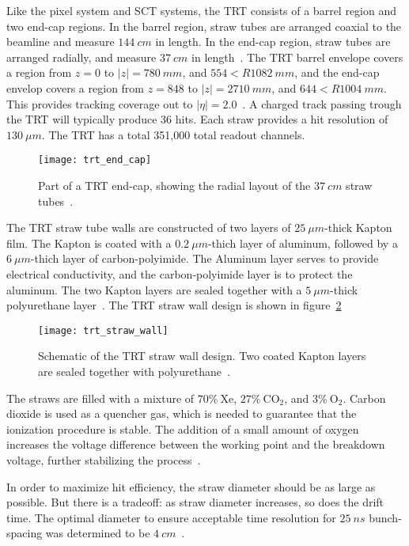 Like the pixel system and SCT systems, the TRT consists of a barrel region and two end-cap regions.
In the barrel region, straw tubes are arranged coaxial to the beamline and measure $144~cm$ in length.
In the end-cap region, straw tubes are arranged radially, and measure $37~cm$ in length~\cite{atlas-detector-2008}.
The TRT barrel envelope covers a region from $z = 0$ to $|z|  = 780~mm$, and $554 < R 1082~mm$, and the end-cap envelop covers a region from $z = 848$ to $|z|  = 2710~mm$, and $644 < R 1004~mm$.
This provides tracking coverage out to $|\eta| = 2.0$~\cite{atlas-detector-2008}.
A charged track passing trough the TRT will typically produce 36 hits.
Each straw provides a hit resolution of $130~\mu m$.
The TRT has a total 351,000 total readout channels.

\begin{figure}[!ht]\centering
\texttt{[image: trt\_end\_cap]}
\caption{Part of a TRT end-cap, showing the radial layout of the $37~cm$ straw tubes~\cite{trt-2013}.}
\label{fig:trt_end_cap}
\end{figure}

The TRT straw tube walls are constructed of two layers of $25~\mu m$-thick Kapton film.
The Kapton is coated with a $0.2~\mu m$-thich layer of aluminum, followed by a $6~\mu m$-thich layer of carbon-polyimide.
The Aluminum layer serves to provide electrical conductivity, and the carbon-polyimide layer is to protect the aluminum.
The two Kapton layers are sealed together with a $5~\mu m$-thick polyurethane layer~\cite{trt-2013}.
The TRT straw wall design is shown in figure~\ref{fig:trt_straw_wall}

\begin{figure}[!ht]\centering
\texttt{[image: trt\_straw\_wall]}
\caption{Schematic of the TRT straw wall design. Two coated Kapton layers are sealed together with polyurethane~\cite{trt-2013}.}
\label{fig:trt_straw_wall}
\end{figure}

The straws are filled with a mixture of $70\%~\mathrm{Xe}$, $27\%~\mathrm{CO_2}$, and $3\%~\mathrm{O_2}$.
Carbon dioxide is used as a quencher gas, which is needed to guarantee that the ionization procedure is stable.
The addition of a small amount of oxygen increases the voltage difference between the working point and the breakdown voltage, further stabilizing the process~\cite{trt-2013}.

In order to maximize hit efficiency, the straw diameter should be as large as possible.
But there is a tradeoff: as straw diameter increases, so does the drift time.
The optimal diameter to ensure acceptable time resolution for $25~ns$ bunch-spacing was determined to be $4~cm$~\cite{trt-2013}.

